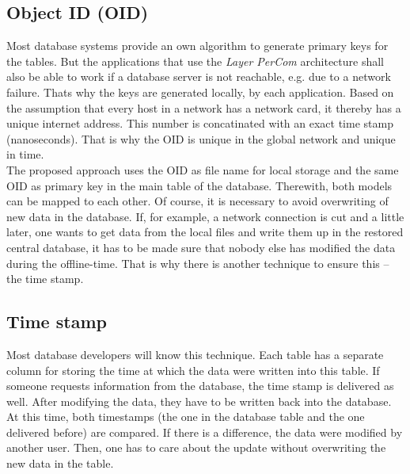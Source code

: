 \subsection{Object ID (OID)}
\label{object_id_section}

Most database systems provide an own algorithm to generate primary keys for the
tables. But the applications that use the \emph{Layer PerCom} architecture shall
also be able to work if a database server is not reachable, e.g. due to a network
failure. Thats why the keys are generated locally, by each application.
Based on the assumption that every host in a network has a network card, it thereby
has a unique internet address. This number is concatinated with an exact time stamp
(nanoseconds). That is why the OID is unique in the global network and unique in time.\\
The proposed approach uses the OID as file name for local storage and the same
OID as primary key in the main table of the database. Therewith, both models can
be mapped to each other. Of course, it is necessary to avoid overwriting of new
data in the database. If, for example, a network connection is cut and a little
later, one wants to get data from the local files and write them up in the restored
central database, it has to be made sure that nobody else has modified the data
during the offline-time. That is why there is another technique to ensure this
-- the time stamp.

\subsection{Time stamp}
\label{time_stamp_section}

Most database developers will know this technique. Each table has a separate
column for storing the time at which the data were written into this table.
If someone requests information from the database, the time stamp is delivered
as well. After modifying the data, they have to be written back into the database.
At this time, both timestamps (the one in the database table and the one delivered
before) are compared. If there is a difference, the data were modified by another
user. Then, one has to care about the update without overwriting the new data in
the table.

